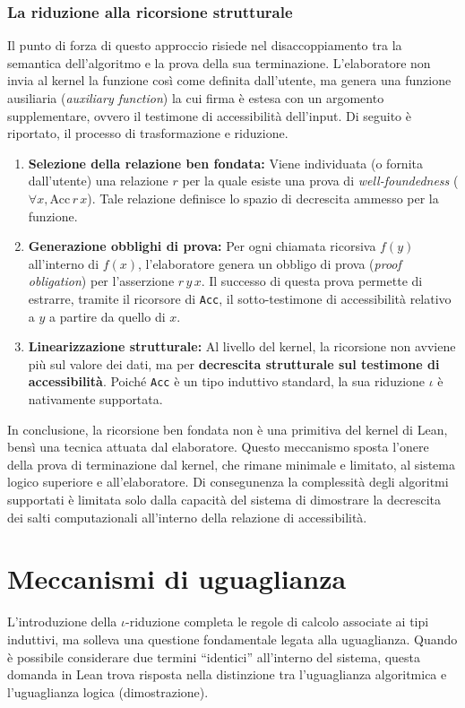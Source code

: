 \subsubsection{La riduzione alla ricorsione strutturale}
Il punto di forza di questo approccio risiede nel disaccoppiamento tra la semantica dell'algoritmo e la prova della sua terminazione. L'elaboratore non invia al kernel 
la funzione così come definita dall'utente, ma genera una funzione ausiliaria (\textit{auxiliary function}) la cui firma è estesa con un argomento supplementare, ovvero 
il testimone di accessibilità dell'input. Di seguito è riportato, il processo di trasformazione e riduzione.
\begin{enumerate}
    \item \textbf{Selezione della relazione ben fondata:} 
        Viene individuata (o fornita dall'utente) una relazione $r$ per la quale esiste una prova di \textit{well-foundedness} 
        ($\forall x, \text{Acc} \, r \, x$). Tale relazione definisce lo spazio di decrescita ammesso per la funzione.
    \item \textbf{Generazione obblighi di prova:} 
        Per ogni chiamata ricorsiva $f(y)$ all'interno di $f(x)$, l'elaboratore genera un obbligo di prova (\textit{proof obligation}) per l'asserzione 
        $r \, y \, x$. Il successo di questa prova permette di estrarre, tramite il ricorsore di \texttt{Acc}, il sotto-testimone di accessibilità relativo 
        a $y$ a partire da quello di $x$.
    \item \textbf{Linearizzazione strutturale:} 
        Al livello del kernel, la ricorsione non avviene più sul valore dei dati, ma per \textbf{decrescita strutturale sul testimone di accessibilità}. 
        Poiché \texttt{Acc} è un tipo induttivo standard, la sua riduzione $\iota$ è nativamente supportata.
\end{enumerate}
In conclusione, la ricorsione ben fondata non è una primitiva del kernel di Lean, bensì una tecnica attuata dal elaboratore. Questo meccanismo sposta l'onere 
della prova di terminazione dal kernel, che rimane minimale e limitato, al sistema logico superiore e all'elaboratore. Di consegunenza la complessità degli 
algoritmi supportati è limitata solo dalla capacità del sistema di dimostrare la decrescita dei salti computazionali all'interno della relazione di accessibilità.

\section{Meccanismi di uguaglianza}
L'introduzione della $\iota$-riduzione completa le regole di calcolo associate ai tipi induttivi, ma solleva una questione fondamentale legata
alla uguaglianza. Quando è possibile considerare due termini ``identici'' all'interno del sistema, questa domanda in Lean trova risposta nella 
distinzione tra l'uguaglianza algoritmica e l'uguaglianza logica (dimostrazione).

